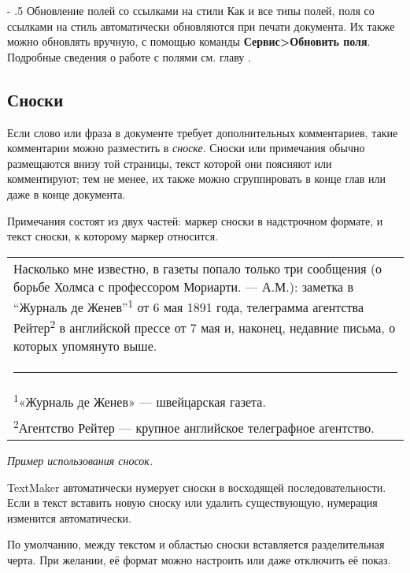 ﻿\documentclass[a4paper,10pt]{article}
\makeatletter
\renewcommand\paragraph{%
   \@startsection{paragraph}{4}{0mm}%
      {-\baselineskip}%
      {.5\baselineskip}%
      {\normalfont\normalsize\bfseries}}
\makeatother
\begin{document}
\paragraph{Обновление полей со ссылками на стили}
Как и все типы полей, поля со ссылками на стиль автоматически обновляются при печати документа. Их также можно обновлять вручную, с помощью команды \textbf{Сервис>Обновить поля}. Подробные сведения о работе с полями см. главу .

\subsection{Сноски}
Если слово или фраза в документе требует дополнительных комментариев, такие комментарии можно разместить в \textit{сноске}. Сноски или примечания обычно размещаются внизу той страницы, текст которой они поясняют или комментируют; тем не менее, их также можно сгруппировать в конце глав или даже в конце документа.

Примечания состоят из двух частей: маркер сноски в надстрочном формате, и текст сноски, к которому маркер относится.

\begin{center}
\begin{tabular}{ | m{15cm} | }
\hline
Насколько мне известно, в газеты попало только три сообщения (о борьбе Холмса с профессором Мориарти. — А.М.): заметка в “Журналь де Женев”\textsuperscript{1} от 6 мая 1891 года, телеграмма агентства Рейтер\textsuperscript{2} в английской прессе от 7 мая и, наконец, недавние письма, о которых упомянуто выше.\\
\noindent\rule{10cm}{0.4pt}\\
\textsuperscript{1}«Журналь де Женев» — швейцарская газета.\\
\textsuperscript{2}Агентство Рейтер — крупное английское телеграфное агентство.\\
\hline
\end{tabular}
\end{center}

{\footnotesize \textit{Пример использования сносок.}}

TextMaker автоматически нумерует сноски в восходящей последовательности. Если в текст вставить новую сноску или удалить существующую, нумерация изменится автоматически. 

По умолчанию, между текстом и областью сноски вставляется разделительная черта. При желании, её формат можно настроить или даже отключить её показ.
\end{document}
